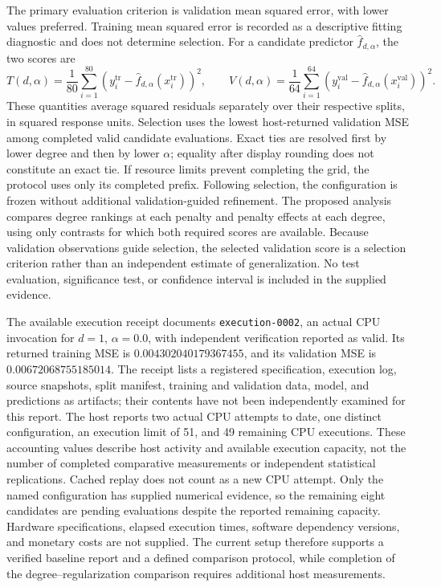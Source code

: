 \documentclass[11pt]{article}
\begin{document}
The primary evaluation criterion is validation mean squared error, with lower values preferred. Training mean squared error is recorded as a descriptive fitting diagnostic and does not determine selection. For a candidate predictor \(\widehat f_{d,\alpha}\), the two scores are
\[
T(d,\alpha)=\frac{1}{80}\sum_{i=1}^{80}
\left(y_i^{\mathrm{tr}}-\widehat f_{d,\alpha}(x_i^{\mathrm{tr}})\right)^2,
\qquad
V(d,\alpha)=\frac{1}{64}\sum_{i=1}^{64}
\left(y_i^{\mathrm{val}}-\widehat f_{d,\alpha}(x_i^{\mathrm{val}})\right)^2.
\]
These quantities average squared residuals separately over their respective splits, in squared response units. Selection uses the lowest host-returned validation MSE among completed valid candidate evaluations. Exact ties are resolved first by lower degree and then by lower \(\alpha\); equality after display rounding does not constitute an exact tie. If resource limits prevent completing the grid, the protocol uses only its completed prefix. Following selection, the configuration is frozen without additional validation-guided refinement. The proposed analysis compares degree rankings at each penalty and penalty effects at each degree, using only contrasts for which both required scores are available. Because validation observations guide selection, the selected validation score is a selection criterion rather than an independent estimate of generalization. No test evaluation, significance test, or confidence interval is included in the supplied evidence.

The available execution receipt documents \texttt{execution-0002}, an actual CPU invocation for \(d=1\), \(\alpha=0.0\), with independent verification reported as valid. Its returned training MSE is \(0.004302040179367455\), and its validation MSE is \(0.00672068755185014\). The receipt lists a registered specification, execution log, source snapshots, split manifest, training and validation data, model, and predictions as artifacts; their contents have not been independently examined for this report. The host reports two actual CPU attempts to date, one distinct configuration, an execution limit of 51, and 49 remaining CPU executions. These accounting values describe host activity and available execution capacity, not the number of completed comparative measurements or independent statistical replications. Cached replay does not count as a new CPU attempt. Only the named configuration has supplied numerical evidence, so the remaining eight candidates are pending evaluations despite the reported remaining capacity. Hardware specifications, elapsed execution times, software dependency versions, and monetary costs are not supplied. The current setup therefore supports a verified baseline report and a defined comparison protocol, while completion of the degree--regularization comparison requires additional host measurements.
\end{document}
